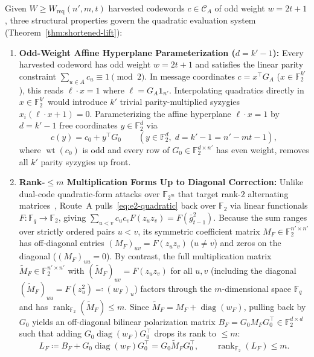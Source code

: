 \documentclass[11pt,a4paper]{article}
\theoremstyle{definition}
\theoremstyle{remark}
\newcommand{\F}{\mathbb{F}}
\newcommand{\wt}{\operatorname{wt}}
\newcommand{\rk}{\operatorname{rank}}
\newcommand{\diag}{\operatorname{diag}}
\begin{document}
Given $W \ge W_{\text{req}}(n', m, t)$ harvested codewords $c \in \mathcal{C}_A$ of odd weight $w = 2t + 1$, three structural properties govern the quadratic evaluation system (Theorem~\ref{thm:shortened-lift}):
\begin{enumerate}[leftmargin=2em]
    \item \textbf{Odd-Weight Affine Hyperplane Parameterization ($d = k' - 1$):}
    Every harvested codeword has odd weight $w = 2t + 1$ and satisfies the linear parity constraint $\sum_{u \in A} c_u \equiv 1 \pmod 2$. In message coordinates $c = x^\top G_A$ ($x \in \F_2^{k'}$), this reads $\ell \cdot x = 1$ where $\ell = G_A \mathbf{1}_{n'}$. Interpolating quadratics directly in $x \in \F_2^{k'}$ would introduce $k'$ trivial parity-multiplied syzygies $x_i(\ell \cdot x + 1) = 0$. Parameterizing the affine hyperplane $\ell \cdot x = 1$ by $d = k' - 1$ free coordinates $y \in \F_2^d$ via
    \begin{equation}
    \label{eq:affine-chart}
        c(y) = c_0 + y^\top G_0 \qquad (y \in \F_2^d,\; d = k' - 1 = n' - mt - 1),
    \end{equation}
    where $\wt(c_0)$ is odd and every row of $G_0 \in \F_2^{d \times n'}$ has even weight, removes all $k'$ parity syzygies up front.
    \item \textbf{Rank-$\le m$ Multiplication Forms Up to Diagonal Correction:}
    Unlike dual-code quadratic-form attacks over $\F_{2^m}$ that target rank-$2$ alternating matrices~\cite{CMT23,BLT26,BLRT26}, Route~A pulls~\eqref{eq:e2-quadratic} back over $\F_2$ via linear functionals $F: \F_q \to \F_2$, giving $\sum_{u < v} c_u c_v F(z_u z_v) = F(\bar{g}_{t-1}^2)$. Because the sum ranges over strictly ordered pairs $u < v$, its symmetric coefficient matrix $M_F \in \F_2^{n' \times n'}$ has off-diagonal entries $(M_F)_{uv} = F(z_u z_v)$ ($u \neq v$) and zeros on the diagonal ($(M_F)_{uu} = 0$). By contrast, the full multiplication matrix $\widetilde{M}_F \in \F_2^{n' \times n'}$ with $(\widetilde{M}_F)_{uv} = F(z_u z_v)$ for all $u, v$ (including the diagonal $(\widetilde{M}_F)_{uu} = F(z_u^2) \eqqcolon (w_F)_u$) factors through the $m$-dimensional space $\F_q$ and has $\rk_{\F_2}(\widetilde{M}_F) \le m$. Since $\widetilde{M}_F = M_F + \diag(w_F)$, pulling back by $G_0$ yields an off-diagonal bilinear polarization matrix $B_F = G_0 M_F G_0^\top \in \F_2^{d \times d}$ such that adding $G_0 \diag(w_F) G_0^\top$ drops its rank to $\le m$:
    \[
        L_F \coloneqq B_F + G_0 \diag(w_F) G_0^\top = G_0 \widetilde{M}_F G_0^\top, \qquad \rk_{\F_2}(L_F) \le m.
\]
\end{enumerate}
\end{document}
